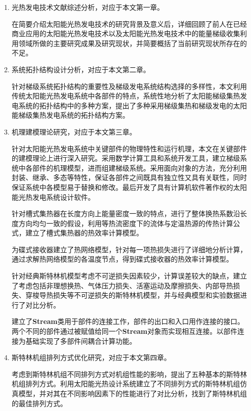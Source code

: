 \begin{enumerate}[label=(\arabic*)]
	
	\item 光热发电技术文献综述分析，对应于本文第一章。
	\setlength\parindent{2em}
	
	在简要介绍太阳能光热发电技术的研究背景及意义后，详细回顾了前人在已经商业应用的太阳能光热发电技术以及太阳能光热发电技术中的能量梯级收集利用领域所做的主要研究成果及研究现状，并简要概括了当前研究现状所存在的不足。
	\item 系统拓扑结构设计分析，对应于本文第二章。
	
	针对梯级系统拓扑结构的重要性及梯级发电系统结构选择的多样性，本文利用传统太阳能光热发电系统中各部件的特点，系统性地分析了太阳能梯级集热发电系统的拓扑结构中的多种方案，提出了多种采用梯级集热和梯级发电的太阳能梯级集热发电系统的拓扑结构方案。 

	\item 机理建模理论研究，对应于本文第三章。
	
	针对太阳能光热发电系统中关键部件的物理特性和运行机理，本文在关键部件的建模理论上进行深入研究。采用数学计算工具和系统开发工具，建立梯级系统中各部件的机理模型，进而组建梯级系统。采用面向对象的方法，充分利用封装、继承、多态等特性，保证各部件之间既具有独立性又具有关联性，同时保证系统中各模型易于替换和修改。最后开发了具有计算机软件著作权的太阳能光热发电系统设计软件。
	
	针对槽式集热器在长度方向上能量密度一致的特点，进行了整体换热系数沿长度方向均匀一致的假设，利用等热流密度下的流体与定温热源的传热计算公式，建立了槽式集热器的热效率计算模型。
	
	为碟式接收器建立了热网络模型，针对每一项热损失进行了详细地分析计算，通过求解热网络模型的各温度节点，得到碟式接收器的热效率计算模型。
	
	针对经典斯特林机模型考虑不可逆损失因素较少，计算误差较大的缺点，建立了考虑包括非理想换热、气体压力损失、活塞运动及摩擦损失、内部导热损失、穿梭导热损失等不可逆损失的斯特林机模型，并与经典模型和实验数据进行了对比分析。
	
	建立了\textbf{Stream}类用于部件的连接工作，部件的出口和入口用作连接的接口。两个不同的部件通过被赋值给同一个\textbf{Stream}对象而实现相互连接。以部件连接为基础实现了多部件间耦合计算功能。

	\item 斯特林机组排列方式优化研究，对应于本文第四章。
	
	考虑到斯特林机组不同排列方式对机组性能的影响，提出了五种基本的斯特林机组排列方式。利用太阳能光热设计系统建立了不同排列方式的斯特林机组仿真模型，并对其在不同影响因素下的性能进行了对比分析，找到了斯特林机组的最佳排列方式。


\end{enumerate}
